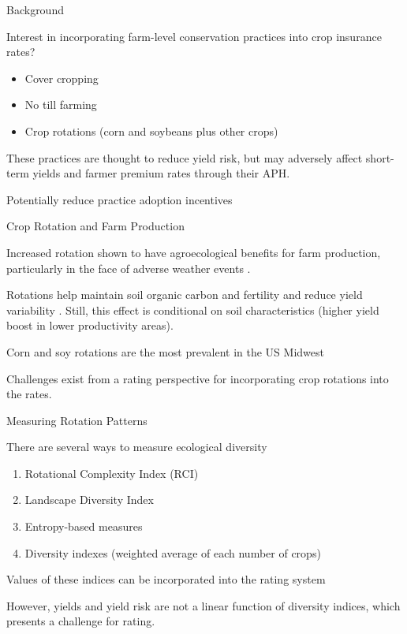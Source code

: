 \documentclass[notes,11pt, aspectratio=169]{beamer}
\newenvironment{wideitemize}{\itemize\addtolength{\itemsep}{10pt}}{\enditemize}
\begin{document}
\begin{frame}{Background}
    \begin{wideitemize}
        \item Interest in incorporating farm-level conservation practices into crop insurance rates?
        \begin{itemize}
            \item Cover cropping
            \item No till farming
            \item Crop rotations (corn and soybeans plus other crops)
        \end{itemize}
        \item These practices are thought to reduce yield risk, but may adversely affect short-term yields and farmer premium rates through their APH.
        \item Potentially reduce practice adoption incentives
    \end{wideitemize}
\end{frame}

\begin{frame}{Crop Rotation and Farm Production}
\begin{wideitemize}
    \item Increased rotation shown to have agroecological benefits for farm production, particularly in the face of adverse weather events \citep{socolar2021, burchfield2024}.
    \item Rotations help maintain soil organic carbon and fertility and reduce yield variability \citep{wu2025}. Still, this effect is conditional on soil characteristics (higher yield boost in lower productivity areas).
    \item Corn and soy rotations are the most prevalent in the US Midwest
    \item Challenges exist from a rating perspective for incorporating crop rotations into the rates.
\end{wideitemize}
\end{frame}

\begin{frame}{Measuring Rotation Patterns}
\begin{wideitemize}
    \item There are several ways to measure ecological diversity
    \begin{enumerate}
        \item Rotational Complexity Index (RCI)
        \item Landscape Diversity Index
        \item Entropy-based measures
        \item Diversity indexes (weighted average of each number of crops)
    \end{enumerate}
    \item Values of these indices can be incorporated into the rating system
    \item However, yields and yield risk are not a linear function of diversity indices, which presents a challenge for rating.
\end{wideitemize}
\end{frame}
\end{document}
